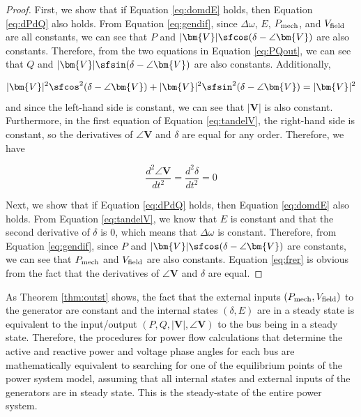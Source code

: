 \documentclass[graybox, envcountchap]{svmult}
\begin{document}
\begin{proof}
First, we show that if Equation \ref{eq:domdE} holds, then Equation
\ref{eq:dPdQ} also holds. From Equation \ref{eq:gendif}, since $\Delta \omega$,
$E$, $P_{\rm mech}$, and $V_{\rm field}$ are all constants, we can see that $P$
and $|\bm{V}|\sfcos (\delta - \angle \bm{V})$ are also constants. Therefore,
from the two equations in Equation \ref{eq:PQout}, we can see that $Q$ and
$|\bm{V}|\sfsin (\delta - \angle \bm{V})$ are also constants. Additionally,

\begin{equation*}
  |\bm{V}|^2\sfcos^2 (\delta - \angle \bm{V}) +
  |\bm{V}|^2\sfsin^2 (\delta - \angle \bm{V}) = |\bm{V}|^2
\end{equation*}
and since the left-hand side is constant, we can see that $|\bm{V}|$ is also
constant. Furthermore, in the first equation of Equation \ref{eq:tandelV}, the
right-hand side is constant, so the derivatives of $\angle \bm{V}$ and $\delta$
are equal for any order. Therefore, we have

\begin{equation*}
\frac{d^2 \angle \bm{V}}{dt^2} = \frac{d^2 \delta}{dt^2} =0
\end{equation*}

Next, we show that if Equation \ref{eq:dPdQ} holds, then Equation \ref{eq:domdE}
also holds. From Equation \ref{eq:tandelV}, we know that $E$ is constant and
that the second derivative of $\delta$ is 0, which means that $\Delta \omega$ is
constant. Therefore, from Equation \ref{eq:gendif}, since $P$ and
$|\bm{V}|\sfcos (\delta - \angle \bm{V})$ are constants, we can see that $P_{\rm
mech}$ and $V_{\rm field}$ are also constants. Equation \ref{eq:frer} is
obvious from the fact that the derivatives of $\angle \bm{V}$ and $\delta$ are
equal.
\end{proof}

As Theorem \ref{thm:outst} shows, the fact that the external inputs $(P_{\rm
mech},V_{\rm field})$ to the generator are constant and the internal states
$(\delta,E)$ are in a steady state is equivalent to the input/output
$(P,Q,|\bm{V}|,\angle \bm{V})$ to the bus being in a steady state. Therefore,
the procedures for power flow calculations that determine the active and
reactive power and voltage phase angles for each bus are mathematically
equivalent to searching for one of the equilibrium points of the power system
model, assuming that all internal states and external inputs of the generators
are in steady state. This is the steady-state of the entire power system.
\end{document}
